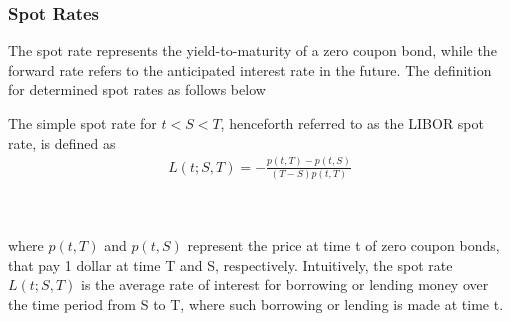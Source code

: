 \subsubsection{Spot Rates}
The spot rate represents the yield-to-maturity of a zero coupon bond,
while the forward rate refers to the anticipated interest rate in the 
future. The definition for determined spot rates as follows 
below
\begin{definition}\label{def:spot}
    The simple spot rate for $t<S<T$, henceforth referred to as the 
    LIBOR spot rate, is defined as \cite{Bjork} 
    \begin{align*}
        L(t;S,T) = - \frac{p(t,T)-p(t,S)}{(T-S)p(t,T)}
    \end{align*}
\end{definition} 
\noindent
\\\\
where $p(t,T)$ and $p(t,S)$ represent the price at time t of zero coupon bonds, that pay
1 dollar at time T and S, respectively. Intuitively, the spot rate $L(t;S,T)$ is the 
average rate of interest for borrowing or lending money over the time period from S to T, 
where such borrowing or lending is made at time t. 
